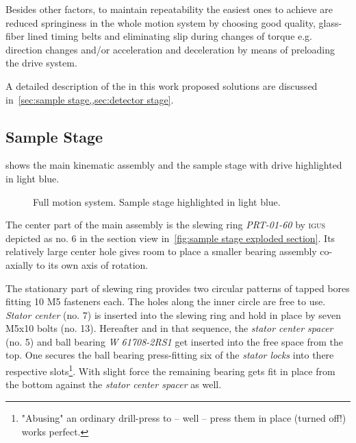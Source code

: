         Besides other factors, to maintain repeatability the easiest ones to achieve are reduced springiness in the whole motion system by choosing good quality, glass-fiber lined timing belts and eliminating slip during changes of torque e.g. direction changes and/or acceleration and deceleration by means of preloading the drive system.\par\medskip

        A detailed description of the in this work proposed solutions are discussed in~\cref{sec:sample stage,,sec:detector stage}.
        
        \subsection{Sample Stage}\label{sec:sample stage}
             shows the main kinematic assembly and the sample stage with drive highlighted in light blue.
            \begin{figure}[ht]
                \centering
                \caption[Full motion system. Sample stage blue highlighted.]{Full motion system. Sample stage highlighted in light blue.}%
                \label{fig:xmagix full sample highlightes}%
            \end{figure}%

            The center part of the main assembly is the slewing ring \textit{PRT-01-60} by \textsc{igus}\cite{Manual.IglidePRTPolymerSlewingRings.} depicted as no. 6 in the section view in~\cref{fig:sample stage exploded section}.
            Its relatively large center hole gives room to place a smaller bearing assembly co-axially to its own axis of rotation.\par\medskip

            The stationary part of slewing ring provides two circular patterns of tapped bores fitting 10 M5 fasteners each.
            The holes along the inner circle are free to use.
            \textit{Stator center} (no. 7) is inserted into the slewing ring and hold in place by seven M5x10 bolts (no. 13).
            Hereafter and in that sequence, the \textit{stator center spacer} (no. 5) and ball bearing \textit{W 61708-2RS1} get inserted into the free space from the top.
            One secures the ball bearing press-fitting six of the \textit{stator locks} into there respective slots\footnote{ "Abusing" an ordinary drill-press to -- well -- press them in place (turned off!) works perfect.}.
            With slight force the remaining bearing gets fit in place from the bottom against the \textit{stator center spacer} as well.
            
